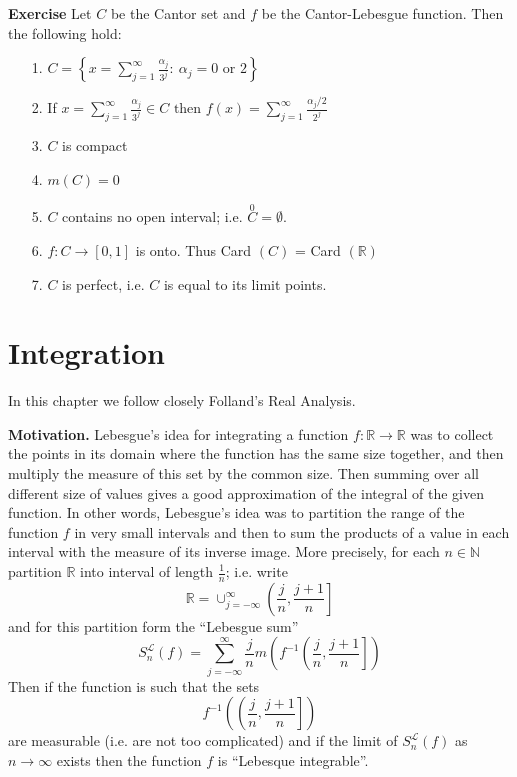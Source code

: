 \documentclass[12pt]{report}
\begin{document}
\bigskip
\noindent
{\bf  Exercise}  Let $C$ be the Cantor set and $f$ be the
Cantor-Lebesgue function.  Then the following hold:

\begin{itemize}
\item[1.] $\displaystyle{C = \left \{x = \sum\limits^\infty_{j=1}
\frac{\alpha_j}{3^j}: \ \alpha_j = 0 \mbox{ or } 2 \right \}}$
\item[2.]   If $\displaystyle{x = \sum\limits^\infty_{j=1} \frac{\alpha_j}{3^{j}}\in C
\mbox{ then } f(x) = \sum\limits^\infty_{j=1} \frac{\alpha_j/2}{2^{j}}}$
\item[3.] $C$ is compact
\item[4.] $m(C) = 0$
\item[5.] $C$ contains no open interval; i.e. $\stackrel{0}{C} = \emptyset$.
\item[6.]  $f: C \longrightarrow [0,1]$ is onto.  Thus Card $(C)$ = Card
$(\mathbb{R})$
\item[7.]  $C$ is perfect, i.e.  $C$ is equal to its limit points.
\end{itemize}

%
%
%



\chapter{Integration }

In this chapter we follow closely  Folland's Real Analysis.


\bigskip
\noindent
{\large\bf Motivation.} Lebesgue's idea for integrating a 
function $f:
\mathbb{R} \to \mathbb{R}$ was to collect the points in its
domain where the function has the same size together, and
then multiply the measure of this set by the common size. 
Then summing over all different size of values gives a good
approximation of the integral  of the given function.  In other
words, Lebesgue's idea was to partition the range of the
function
$f$ in very small intervals and then to sum the products of a 
value in each interval with the measure of its inverse image. 
More precisely, for each $n \in \mathbb{N}$ partition
$\mathbb{R}$ into interval of length $\frac{1}{n}$; i.e. write
\[
\mathbb{R} = {\cup}^\infty_{j= -\infty} \left (
\frac{j}{n},
\frac{j+1}{n}
\right ]
\] 
and for this partition form the ``Lebesgue sum''
\[
 S^{\mathcal{L}}_n (f) = \sum^\infty_{j = - \infty} \frac{j}{n} m
\left ( f^{-1}
\left ( \frac{j}{n}, \frac{j+1}{n} \right ] \right )
\] 
Then if the function is such that the sets
\[ f^{-1} \left ( \left ( \frac{j}{n}, \frac{j+1}{n} \right ] \right )
\]
 are measurable (i.e. are not too complicated) and if the limit of
$S^{\mathcal{L}}_n(f)$ as $n \to \infty$ exists then the function $f$ is
``Lebesque integrable''.
\end{document}
